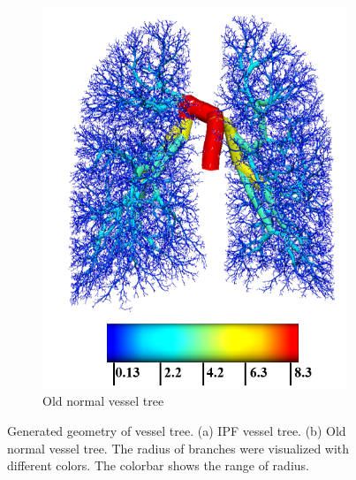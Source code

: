 \begin{figure}[htbp]
\begin{subfigure}{.38\linewidth}
  \includegraphics[width=\linewidth,trim={{.0\wd0} {.0\wd0} {.0\wd0} {.0\wd0}},clip]{ModelBasedAnalysis/Image/IPF405_ArteryRadius_Normal.png}
  \caption{Old normal vessel tree}
  \label{fig:VesselTreeGeometry-b} 
\end{subfigure}
\caption{Generated geometry of vessel tree. (a) IPF vessel tree. (b) Old normal vessel tree. The radius of branches were visualized with different colors. The colorbar shows the range of radius.} 
\label{fig:VesselTreeGeometry}
\end{figure}

